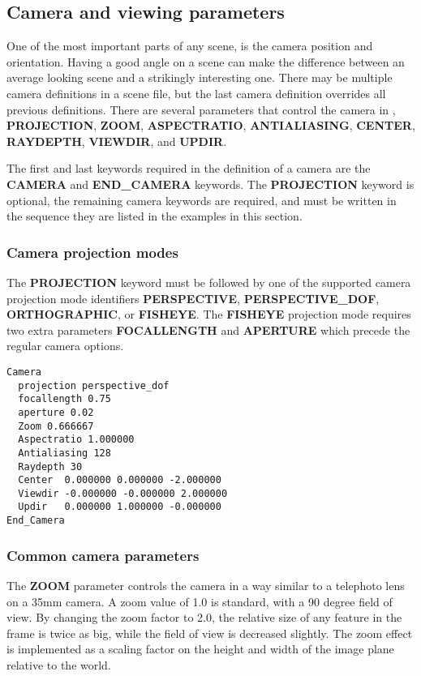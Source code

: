 \subsection{Camera and viewing parameters}
  One of the most important parts of any scene, is the camera position and
orientation.  Having a good angle on a scene can make the difference between
an average looking scene and a strikingly interesting one.  There may be
multiple camera definitions in a scene file, but the last camera definition
overrides all previous definitions.
There are several parameters that control the camera in \RAY, 
{\bf PROJECTION}, {\bf ZOOM}, {\bf ASPECTRATIO}, {\bf ANTIALIASING},
 {\bf CENTER}, {\bf RAYDEPTH}, {\bf VIEWDIR}, and {\bf UPDIR}.  

The first and last keywords required in the definition of a camera are the 
{\bf CAMERA} and {\bf END\_CAMERA} keywords.  The {\bf PROJECTION} keyword 
is optional, the remaining camera keywords are required, and must be 
written in the sequence they are listed in the examples in this section.

\subsubsection{Camera projection modes}
  The {\bf PROJECTION} keyword must be followed by one of the supported
camera projection mode identifiers {\bf PERSPECTIVE}, {\bf PERSPECTIVE_DOF}, 
{\bf ORTHOGRAPHIC}, or {\bf FISHEYE}.  The {\bf FISHEYE} projection mode 
requires two extra parameters {\bf FOCALLENGTH} and {\bf APERTURE} 
which precede the regular camera options.

\begin{verbatim}
Camera
  projection perspective_dof
  focallength 0.75
  aperture 0.02
  Zoom 0.666667
  Aspectratio 1.000000
  Antialiasing 128
  Raydepth 30
  Center  0.000000 0.000000 -2.000000
  Viewdir -0.000000 -0.000000 2.000000
  Updir   0.000000 1.000000 -0.000000
End_Camera
\end{verbatim}

\subsubsection{Common camera parameters}
  The {\bf ZOOM} parameter controls the camera in a way similar to a 
telephoto lens on a 35mm camera.  A zoom value of 1.0 is standard, 
with a 90 degree field of view.  By changing the zoom factor to 2.0, 
the relative size of any feature in the frame is twice as big, while 
the field of view is decreased slightly.  The zoom effect is 
implemented as a scaling factor on the height and width of the image 
plane relative to the world.


